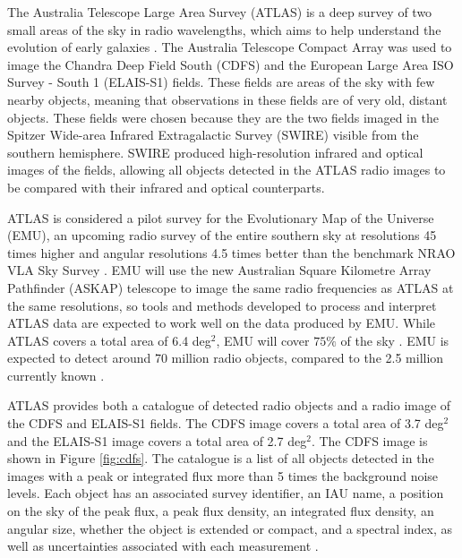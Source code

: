         The Australia Telescope Large Area Survey (ATLAS) is a deep  survey of two small areas of the sky in radio wavelengths, which aims to help understand the evolution of early galaxies \citep{norris06}. The Australia Telescope Compact Array was used to image the Chandra Deep Field South (CDFS) and the European Large Area ISO Survey - South 1 (ELAIS-S1) fields. These fields are areas of the sky with few nearby objects, meaning that observations in these fields are of very old, distant objects. These fields were chosen because they are the two fields imaged in the Spitzer Wide-area Infrared Extragalactic Survey (SWIRE) visible from the southern hemisphere. SWIRE produced high-resolution infrared and optical images of the fields, allowing all objects detected in the ATLAS radio images to be compared with their infrared and optical counterparts.

        ATLAS is considered a pilot survey for the Evolutionary Map of the Universe (EMU), an upcoming radio survey of the entire southern sky at resolutions 45 times higher and angular resolutions 4.5 times better than the benchmark NRAO VLA Sky Survey \citep{norris11b}. EMU will use the new Australian Square Kilometre Array Pathfinder (ASKAP) telescope to image the same radio frequencies as ATLAS at the same resolutions, so tools and methods developed to process and interpret ATLAS data are expected to work well on the data produced by EMU. While ATLAS covers a total area of 6.4 deg$^2$, EMU will cover $75\%$ of the sky \citep{norris11b, norris16}. EMU is expected to detect around 70 million radio objects, compared to the 2.5 million currently known \citep{banfield15}.

        ATLAS provides both a catalogue of detected radio objects and a radio image of the CDFS and ELAIS-S1 fields. The CDFS image covers a total area of 3.7 deg$^2$ and the ELAIS-S1 image covers a total area of 2.7 deg$^2$. The CDFS image is shown in Figure \ref{fig:cdfs}. The catalogue is a list of all objects detected in the images with a peak or integrated flux more than 5 times the background noise levels. Each object has an associated survey identifier, an IAU name, a position on the sky of the peak flux, a peak flux density, an integrated flux density, an angular size, whether the object is extended or compact, and a spectral index, as well as uncertainties associated with each measurement \citep{franzen15}.


